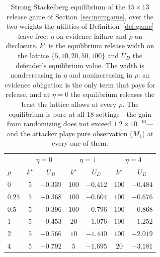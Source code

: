 \begin{table}[t]
\caption{Strong Stackelberg equilibrium of the $15\times13$ release game
of Section~\ref{sec:numgame}, over the two weights the utilities of
Definition~\ref{def:game} leave free: $\eta$ on evidence failure and $\rho$ on
disclosure. $k^\star$ is the equilibrium release width on the lattice
$\{5,10,20,50,100\}$ and $U_D$ the defender's equilibrium value. The width is
nondecreasing in $\eta$ and nonincreasing in $\rho$: an evidence obligation is
the only term that pays for release, and at $\eta=0$ the equilibrium releases
the least the lattice allows at every $\rho$. The equilibrium is pure at all
$18$ settings---the gain from randomizing does not
exceed $1.2\times10^{-16}$---and the attacker plays pure observation
($M_4$) at every one of them.}
\label{tab:numgame}
\centering
\footnotesize
\begin{tabular}{@{}lcccccc@{}}
\toprule
& \multicolumn{2}{c}{$\eta=0$} & \multicolumn{2}{c}{$\eta=1$} & \multicolumn{2}{c}{$\eta=4$}\\
$\rho$ & $k^\star$ & $U_D$ & $k^\star$ & $U_D$ & $k^\star$ & $U_D$\\
\midrule
$0$ & $5$ & $-0.339$ & $100$ & $-0.412$ & $100$ & $-0.484$\\
$0.25$ & $5$ & $-0.368$ & $100$ & $-0.604$ & $100$ & $-0.676$\\
$0.5$ & $5$ & $-0.396$ & $100$ & $-0.796$ & $100$ & $-0.868$\\
$1$ & $5$ & $-0.453$ & $20$ & $-1.076$ & $100$ & $-1.252$\\
$2$ & $5$ & $-0.566$ & $10$ & $-1.440$ & $100$ & $-2.019$\\
$4$ & $5$ & $-0.792$ & $5$ & $-1.695$ & $20$ & $-3.181$\\
\bottomrule
\end{tabular}
\end{table}
